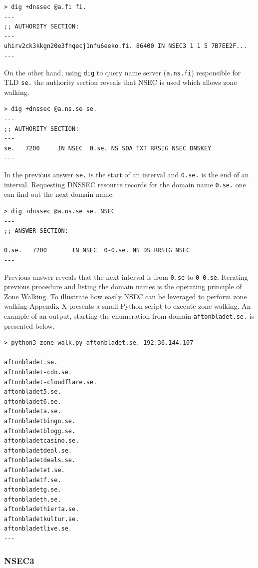 \begin{verbatim}
> dig +dnssec @a.fi fi.
---
;; AUTHORITY SECTION:
---
uhirv2ck3kkgn20e3fnqecj1nfu6eeko.fi. 86400 IN NSEC3 1 1 5 7B7EE2F...
---
\end{verbatim}

On the other hand, using \texttt{dig} to query name server (\texttt{a.ns.fi}) responsible for TLD \texttt{se.} the authority section reveals that NSEC is used which allows zone walking.

\begin{verbatim}
> dig +dnssec @a.ns.se se.
---
;; AUTHORITY SECTION:
---
se.   7200	   IN NSEC 	0.se. NS SOA TXT RRSIG NSEC DNSKEY
---
\end{verbatim}

In the previous answer \texttt{se.} is the start of an interval and \texttt{0.se.} is the end of an interval. Requesting DNSSEC resource records for the domain name \texttt{0.se.} one can find out the next domain name:

\begin{verbatim}
> dig +dnssec @a.ns.se se. NSEC
---
;; ANSWER SECTION:
---
0.se.   7200	   IN NSEC 	0-0.se. NS DS RRSIG NSEC
---
\end{verbatim}

Previous answer reveals that the next interval is from \texttt{0.se} to \texttt{0-0.se}. Iterating previous procedure and listing the domain names is the operating principle of Zone Walking. To illustrate how easily NSEC can be leveraged to perform zone walking Appendix X presents a small Python script to execute zone walking. An example of an output, starting the enumeration from domain \texttt{aftonbladet.se.} is presented below.

\begin{verbatim}
> python3 zone-walk.py aftonbladet.se. 192.36.144.107

aftonbladet.se.
aftonbladet-cdn.se.
aftonbladet-cloudflare.se.
aftonbladet5.se.
aftonbladet6.se.
aftonbladeta.se.
aftonbladetbingo.se.
aftonbladetblogg.se.
aftonbladetcasino.se.
aftonbladetdeal.se.
aftonbladetdeals.se.
aftonbladetet.se.
aftonbladetf.se.
aftonbladetg.se.
aftonbladeth.se.
aftonbladethierta.se.
aftonbladetkultur.se.
aftonbladetlive.se.
---
\end{verbatim}

\subsubsection{NSEC3}

